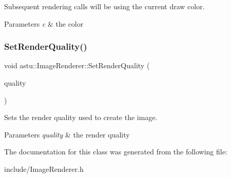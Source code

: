 Subsequent rendering calls will be using the current draw color.


\begin{DoxyParams}{Parameters}
{\em c} & the color \\
\hline
\end{DoxyParams}
\mbox{\label{classastu_1_1ImageRenderer_a154491f8ef39881eeaba56f9d8ca24e8}} 
\subsubsection{\texorpdfstring{Set\+Render\+Quality()}{SetRenderQuality()}}
{\footnotesize\ttfamily void astu\+::\+Image\+Renderer\+::\+Set\+Render\+Quality (\begin{DoxyParamCaption}\item[{\hyperlink{group__gfx__group_gac3b4955f341cea44f53f8446d734cd54}{Render\+Quality}}]{quality }\end{DoxyParamCaption})}

Sets the render quality used to create the image.


\begin{DoxyParams}{Parameters}
{\em quality} & the render quality \\
\hline
\end{DoxyParams}


The documentation for this class was generated from the following file\+:\begin{DoxyCompactItemize}
\item 
include/Image\+Renderer.\+h\end{DoxyCompactItemize}
